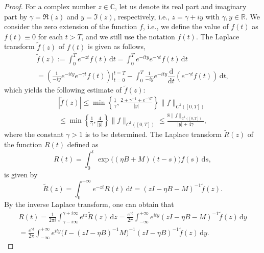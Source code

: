 \documentclass{article}
\theoremstyle{plain}%
\theoremstyle{definition}%
\theoremstyle{remark}%
\newcommand{\bC}{\mathbb{C}}
\newcommand{\bR}{\mathbb{R}}
\newcommand{\rd}{\mathrm{d}}
\newcommand{\+}[1]{{\bm{#1}}}
\newcommand{\od}[2]{\dfrac{\rd{#1}}{\rd{#2}}}
\begin{document}
\begin{proof}
  For a complex number $z \in \bC$, let us denote its real part and 
  imaginary part by $\gamma = \Re(z)$ and $y = \Im(z)$, respectively, 
  i.e., $z = \gamma + i y$ with $\gamma, y \in \bR$.
  We consider the zero extension of the function $f$, i.e., we define 
  the value of $f(t)$ as $f(t) \equiv 0$ for each $t > T$, and we 
  still use the notation $f(t)$.
  The Laplace transform $\tilde{f}(z)$ of $f(t)$ is given as follows,
  \begin{multline*}
    \tilde{f}(z) := \int_0^T e^{- z t} f(t) \,\rd t = 
    \int_0^T e^{- i t y} e^{- \gamma t} f(t) \,\rd t \\
    = \left( \frac{1}{- i y} e^{-i t y} e^{- \gamma t} f(t) \right)
    \bigg|_{t = 0}^{t = T} - \int_0^T \frac{1}{- i y} e^{- i t y}
    \od{}{t} \left( e^{- \gamma t} f(t) \right) \,\rd t,
  \end{multline*}
  which yields the following estimate of $\tilde{f}(z)$:
  \begin{multline*}
    |\tilde{f}(z)| \le \min \left\{ \frac{1}{\gamma}, 
    \frac{2 + \gamma^{-1} + e^{- \gamma T}}{|y|} \right\} 
    \|f\|_{C^1([0,T])} \\ 
    \le \min \left\{ \frac{1}{\gamma}, \frac{4}{|y|} \right\}
    \|f\|_{C^1([0,T])}
    \le \frac{8 \|f\|_{C^1([0,T])}}{|y| + 4 \gamma},
  \end{multline*}
  where the constant $\gamma > 1$ is to be determined.
  The Laplace transform $\tilde{R}(z)$ of the function $R(t)$ defined 
  as 
  \begin{displaymath}
    R(t) = \int_0^t \exp \big( (\eta B + M)(t - s) \big) f(s) \,\rd s,
  \end{displaymath}
  is given by 
  \begin{displaymath}
    \tilde{R}(z) = \int_0^{+\infty} e^{- z t} R(t) \,\rd t = 
    (z I - \eta B - M)^{-1} \tilde{f}(z).
  \end{displaymath}
  By the inverse Laplace transform, one can obtain that 
  \begin{multline*}
    R(t) = \frac{1}{2 \pi i} 
    \int_{\gamma - i \infty}^{\gamma + i \infty} e^{t z} 
    \tilde{R}(z) \,\rd z 
    = \frac{e^{\gamma t}}{2 \pi} \int_{-\infty}^{+\infty}  
    e^{i t y} (z I - \eta B - M)^{-1} \tilde{f}(z) \,\rd y \\
    = \frac{e^{\gamma t}}{2 \pi} \int_{-\infty}^{+\infty} 
    e^{i t y} \big( I - (z I - \eta B)^{-1} M \big)^{-1} 
    (z I - \eta B)^{-1} \tilde{f}(z) \,\rd y.
  \end{multline*}

\end{proof}
\end{document}
